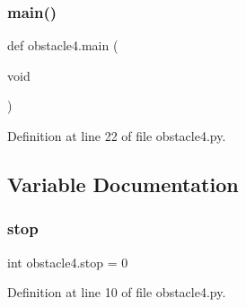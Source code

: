\subsubsection{\texorpdfstring{main()}{main()}}
{\footnotesize\ttfamily def obstacle4.\+main (\begin{DoxyParamCaption}\item[{void}]{ }\end{DoxyParamCaption})}



Definition at line 22 of file obstacle4.\+py.



\subsection{Variable Documentation}
\mbox{\label{namespaceobstacle4_a963efb21ed8c95168d4ad982ce3745ca}} 
\subsubsection{\texorpdfstring{stop}{stop}}
{\footnotesize\ttfamily int obstacle4.\+stop = 0}



Definition at line 10 of file obstacle4.\+py.

